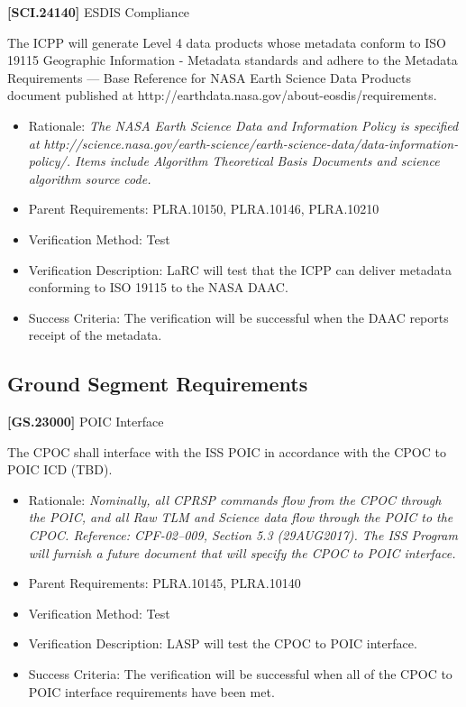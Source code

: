 \documentclass[12pt,oneside,oldfontcommands]{memoir}
\begin{document}
\textbf{[SCI.24140]} \gls{ESDIS} Compliance

The \gls{ICPP} will generate Level 4 data products whose metadata conform to ISO 19115 Geographic Information - Metadata standards and adhere to the Metadata Requirements --- Base Reference for NASA Earth Science Data Products document published at http:\slash \slash earthdata.nasa.gov\slash about-eosdis\slash requirements.

\begin{itemize}
\item{} Rationale: \emph{The NASA Earth Science Data and Information Policy is specified at http:\slash \slash science.nasa.gov\slash earth-science\slash earth-science-data\slash data-information-policy\slash . Items include Algorithm Theoretical Basis Documents and science algorithm source code.}

\item{} Parent Requirements: PLRA.10150, PLRA.10146, PLRA.10210

\item{} Verification Method: Test

\item{} Verification Description: \gls{LaRC} will \gls{test} that the \gls{ICPP} can deliver metadata conforming to ISO 19115 to the NASA \gls{DAAC}.

\item{} Success Criteria: The verification will be successful when the \gls{DAAC} reports receipt of the metadata.

\end{itemize}

\subsection{Ground Segment Requirements}
\label{groundsegmentrequirements}

\textbf{[GS.23000]} \gls{POIC} Interface

The \gls{CPOC} shall interface with the \gls{ISS} \gls{POIC} in accordance with the \gls{CPOC} to \gls{POIC} ICD (TBD).

\begin{itemize}
\item{} Rationale: \emph{Nominally, all CPRSP commands flow from the CPOC through the POIC, and all Raw TLM and Science data flow through the POIC to the CPOC. Reference: CPF-02--009, Section 5.3 (29AUG2017). The ISS Program will furnish a future document that will specify the CPOC to POIC interface.}

\item{} Parent Requirements: PLRA.10145, PLRA.10140

\item{} Verification Method: Test

\item{} Verification Description: \gls{LASP} will \gls{test} the \gls{CPOC} to \gls{POIC} interface.

\item{} Success Criteria: The verification will be successful when all of the \gls{CPOC} to \gls{POIC} interface requirements have been met.

\end{itemize}
\end{document}
